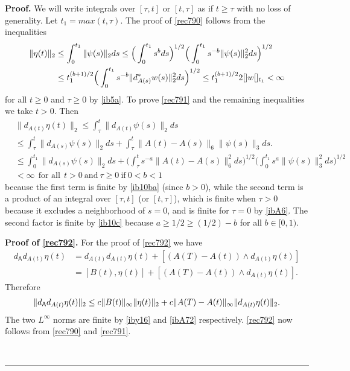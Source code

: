 \documentclass[12pt]{article}
\newenvironment{proof}[1][Proof]{\textbf{#1.} }{\ \rule{0.5em}{0.5em}}
\def \({\Big(}
\def \){\Big)}
\def \As{\mathsf{A}}
\def \nn{[]}
\def \eref{\eqref}
\numberwithin{equation}{section}
\begin{document}
                \begin{proof} We will write integrals over $[\tau, t]$ or $[t, \tau]$ as if $ t \ge \tau$ with
 no loss of generality. Let $t_1 = max(t, \tau)$.  The proof of \eref{rec790} follows from the inequalities 
 \begin{align}
 \|\eta(t)\|_2 &\le \int_0^{t_1}\|\psi(s)\|_2 ds  \le \Big(\int_0^{t_1} s^{b} ds \Big)^{1/2}\Big(\int_0^{t_1} s^{-b}
      \|\psi(s)\|_2^2 ds\Big)^{1/2}   \notag\\
      &\le t_1^{(b+1)/2} \(\int_0^{t_1}s^{-b} \|d_{A(s)}^* w(s)\|_2^2 ds\)^{1/2} 
                             \le t_1^{(b+1)/2}2\nn w\nn_{t_1} <\infty                                 \notag
 \end{align} 
  for all  $t\ge0$ and $ \tau \ge 0$ by \eref{ib5a}. 
To prove \eref{rec791} and the remaining inequalities we  take $t >0$. Then     
     \begin{align*}
&\| d_{A(t)} \eta(t)\|_2 \le \int_\tau^t \|d_{A(t)} \psi(s)\|_2ds \\
&\le \int_\tau^t \| d_{A(s)}\psi(s)\|_2 ds  + \int_\tau^t \|A(t) - A(s)\|_6 \|\psi(s)\|_3 ds. \\
&\le \int_0^{t_1} \| d_{A(s)}\psi(s)\|_2 ds +\(\int_\tau^t s^{-a}\|A(t) - A(s)\|_6^2 ds\)^{1/2} 
                   \(\int_0^{t_1} s^a\|\psi(s)\|_3^2 ds\)^{1/2}  \\
                   &<\infty\ \    \text{for all} \ \ t>0\  \text{and}\ \tau \ge 0\  \text{if}\ 0 < b <1\ 
\end{align*}
 because the first term is finite by \eref{ib10ba} (since $b >0$), while the second term
 is a product  of an integral over $[\tau, t]$  (or $[t, \tau]$), which is finite when $\tau >0$ because it  
  excludes a neighborhood of $ s =0$,  and is finite for $\tau =0$ by 
\eref{ibA6}.   The second factor is finite by \eref{ib10c} because $ a \ge 1/2 \ge (1/2) - b$ for all $b \in [0, 1)$.




{\bf Proof of \eref{rec792}. } 
For the proof of \eref{rec792} we have
\begin{align*}
d_\As d_{A(t)} \eta(t) &= d_{A(t)}d_{A(t)}\eta(t) +[(A(T) - A(t))\wedge   d_{A(t)} \eta(t)] \\
&= [B(t), \eta(t)] + [(A(T) - A(t))\wedge   d_{A(t)} \eta(t)]. 
\end{align*}
Therefore
\begin{align}
\|d_\As d_{A(t)} \eta(t)\|_2 \le c \|B(t)\|_\infty \|\eta(t)\|_2 + c \|A(T) -A(t)\|_\infty \|  d_{A(t)} \eta(t)\|_2. \notag
\end{align}
The two  $L^\infty$ 
 norms are finite by  \eref{iby16} and \eref{ibA72} 
 respectively.  \eref{rec792} now follows from \eref{rec790} and \eref{rec791}.


\end{proof}
\end{document}
